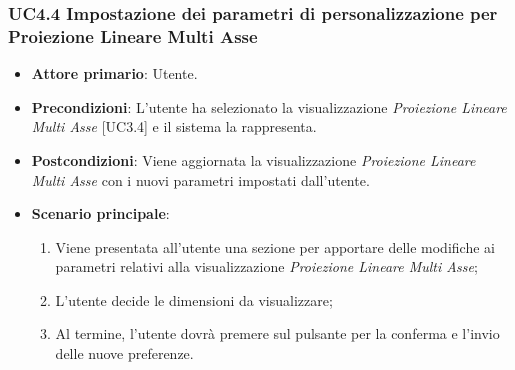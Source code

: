 \subsubsection{UC4.4 Impostazione dei parametri di personalizzazione per Proiezione Lineare Multi Asse}
\begin{itemize}
	\item \textbf{Attore primario}: Utente.
	\item \textbf{Precondizioni}: L'utente ha selezionato la visualizzazione \textit{Proiezione Lineare Multi Asse} [UC3.4] e il sistema la rappresenta.
	\item \textbf{Postcondizioni}: Viene aggiornata la visualizzazione \textit{Proiezione Lineare Multi Asse} con i nuovi parametri impostati dall'utente.
	\item \textbf{Scenario principale}:
	\begin{enumerate}
			\item Viene presentata all'utente una sezione per apportare delle modifiche ai parametri relativi alla visualizzazione \textit{Proiezione Lineare Multi Asse};
			\item L'utente decide le dimensioni da visualizzare;
			\item Al termine, l'utente dovrà premere sul pulsante per la conferma e l'invio delle nuove preferenze.
		\end{enumerate}
\end{itemize}